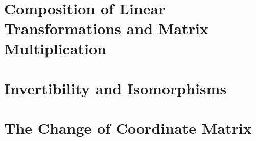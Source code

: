 \vspace{12pt}

\setcounter{Exercise}{7}


\vspace{12pt}

\setcounter{Exercise}{11}


\vspace{12pt}

\setcounter{Exercise}{15}



\section{Composition of Linear Transformations and Matrix
Multiplication}



\vspace{12pt}



\vspace{12pt}

\setcounter{Exercise}{11}


\vspace{12pt}




\section{Invertibility and Isomorphisms}



\vspace{12pt}



\vspace{12pt}



\vspace{12pt}

\setcounter{Exercise}{4}


\vspace{12pt}




\section{The Change of Coordinate Matrix}

